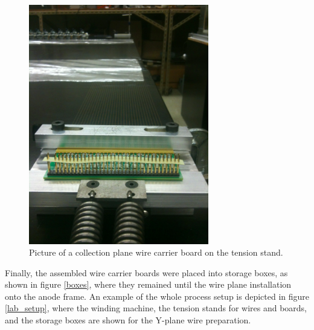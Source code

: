 \begin{figure}[htb]
\centering
\includegraphics[angle=0,width=0.7\textwidth]{figures/wire-boardtension.png}
\caption{Picture of a collection plane wire carrier board on the tension stand.}
\label{fig:stress-stand}
\end{figure}

Finally, the assembled wire carrier boards were placed into storage boxes, as shown in figure \ref{boxes}, where they remained until the wire plane installation onto the anode frame. An example of the whole process setup is depicted in figure \ref{lab_setup}, where the winding machine, the  tension stands for wires and boards, and the storage boxes are shown for the Y-plane wire preparation.

